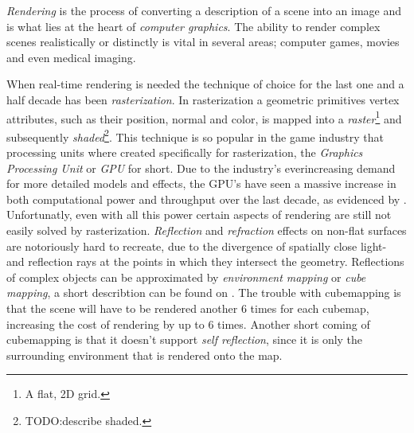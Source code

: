 





\textit{Rendering} is the process of converting a description of a
scene into an image and is what lies at the heart of \textit{computer
  graphics}. The ability to render complex scenes realistically or
distinctly is vital in several areas; computer games, movies and even
medical imaging.



When real-time rendering is needed the technique of choice for the
last one and a half decade has been \textit{rasterization}. In
rasterization a geometric primitives vertex attributes, such as their
position, normal and color, is mapped into a
\textit{raster}\footnote{A flat, 2D grid.} and subsequently
\textit{shaded}\footnote{TODO:describe shaded.}. This technique is so
popular in the game industry that processing units where created
specifically for rasterization, the \textit{Graphics Processing Unit}
or \textit{GPU} for short. Due to the industry's everincreasing demand
for more detailed models and effects, the GPU's have seen a massive
increase in both computational power and throughput over the last
decade, as evidenced by . Unfortunatly, even with
all this power certain aspects of rendering are still not easily
solved by rasterization. \textit{Reflection} and \textit{refraction}
effects on non-flat surfaces are notoriously hard to recreate, due to
the divergence of spatially close light- and reflection rays at the
points in which they intersect the geometry. Reflections of complex
objects can be approximated by \textit{environment mapping} or
\textit{cube mapping}, a short describtion can be found on
. The trouble with cubemapping is that the scene
will have to be rendered another 6 times for each cubemap, increasing
the cost of rendering by up to 6 times. Another short coming of
cubemapping is that it doesn't support \textit{self reflection}, since
it is only the surrounding environment that is rendered onto the map.

